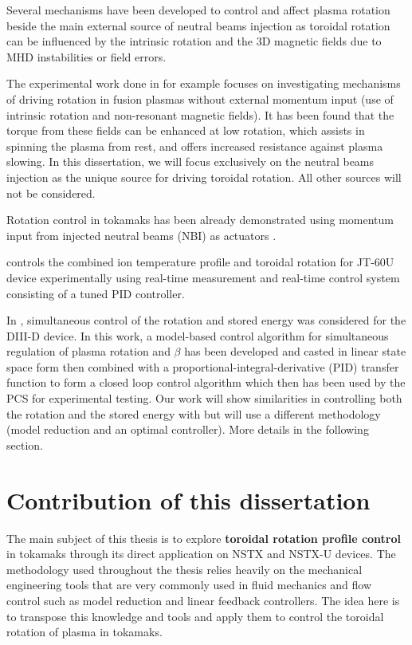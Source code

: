 \documentclass[12pt,lot, lof]{puthesis}
\begin{document}
Several mechanisms have been developed to control and affect plasma rotation beside the main external source of neutral beams injection as toroidal rotation can be influenced by the intrinsic rotation and the 3D magnetic fields due to MHD instabilities or field errors.

The experimental work done in \cite{Solomon10} for example focuses on investigating mechanisms of driving rotation in fusion plasmas without external momentum input (use of intrinsic rotation and non-resonant magnetic fields). It has been found that the torque from these fields can be enhanced at low rotation, which assists in spinning the plasma from rest, and offers increased resistance against plasma slowing.
In this dissertation, we will focus exclusively on the neutral beams injection as the unique source for driving toroidal rotation. All other sources will not be considered.

Rotation control in tokamaks has been already demonstrated using momentum input from injected neutral beams (NBI) as actuators \cite{Scoville07, Yoshida09}.

\cite{Yoshida09} controls the combined ion temperature profile and toroidal rotation for JT-60U device experimentally using real-time measurement and real-time control system consisting of a tuned PID controller.

In \cite{Scoville07}, simultaneous control of the rotation and stored energy was considered for the DIII-D device. In this work,  a model-based control algorithm for simultaneous regulation of plasma rotation and $\beta$ has been developed and casted in linear state space form then combined with a proportional-integral-derivative (PID) transfer function to form a closed loop control algorithm which then has been used by the PCS for experimental testing. Our work will show similarities in controlling both the rotation and the stored energy with \cite{Scoville07} but will use a different methodology (model reduction and an optimal controller). More details in the following section.

\section{Contribution of this dissertation}

The main subject of this thesis is to explore \textbf{toroidal rotation profile control}  in tokamaks through its direct application on NSTX and NSTX-U devices. 
The methodology used throughout the thesis relies heavily on the mechanical engineering tools that are very commonly used in fluid mechanics and flow control such as model reduction and linear feedback controllers. The idea here is to transpose this knowledge and tools and apply them to control the toroidal rotation of plasma in tokamaks. 
\end{document}
